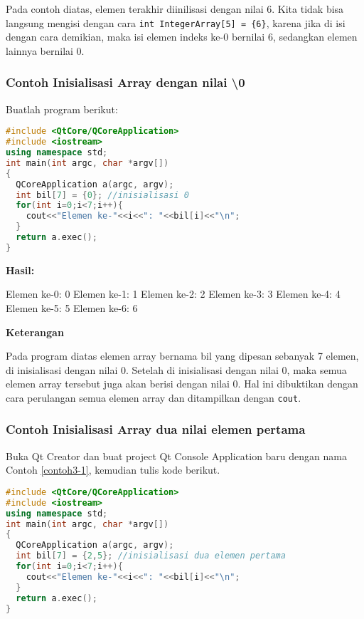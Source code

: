 Pada contoh diatas, elemen terakhir diinilisasi dengan nilai 6. Kita
tidak bisa langsung mengisi dengan cara
\texttt{int\ IntegerArray{[}5{]}\ =\ \{6\}}, karena jika di isi dengan
cara demikian, maka isi elemen indeks ke-0 bernilai 6, sedangkan elemen
lainnya bernilai 0.

\subsubsection*{Contoh  Inisialisasi Array dengan nilai \textbackslash{}0}

Buatlah program berikut:

\begin{lstlisting}[language=c++, caption=Inisialisasi Array dengan nilai \textbackslash{}0, label=contoh3-4]
#include <QtCore/QCoreApplication>
#include <iostream>
using namespace std;
int main(int argc, char *argv[])
{
  QCoreApplication a(argc, argv);
  int bil[7] = {0}; //inisialisasi 0
  for(int i=0;i<7;i++){
    cout<<"Elemen ke-"<<i<<": "<<bil[i]<<"\n";
  }
  return a.exec();
}
\end{lstlisting}

\textbf{Hasil:}

\begin{lcverbatim}
Elemen ke-0: 0
Elemen ke-1: 1
Elemen ke-2: 2
Elemen ke-3: 3
Elemen ke-4: 4
Elemen ke-5: 5
Elemen ke-6: 6
\end{lcverbatim}

\textbf{Keterangan}

Pada program diatas elemen array bernama bil yang dipesan sebanyak 7
elemen, di inisialisasi dengan nilai 0. Setelah di inisialisasi dengan
nilai 0, maka semua elemen array tersebut juga akan berisi dengan nilai
0. Hal ini dibuktikan dengan cara perulangan semua elemen array dan
ditampilkan dengan \texttt{cout}.

\subsubsection*{Contoh  Inisialisasi Array dua nilai elemen pertama}

Buka Qt Creator dan buat project Qt Console Application baru dengan
nama Contoh \ref{contoh3-1}, kemudian tulis kode berikut.

\begin{lstlisting}[language=c++, caption=Inisialisasi Array dua nilai elemen pertama, label=contoh3-5]
#include <QtCore/QCoreApplication>
#include <iostream>
using namespace std;
int main(int argc, char *argv[])
{
  QCoreApplication a(argc, argv);
  int bil[7] = {2,5}; //inisialisasi dua elemen pertama
  for(int i=0;i<7;i++){
    cout<<"Elemen ke-"<<i<<": "<<bil[i]<<"\n";
  }
  return a.exec();
}
\end{lstlisting}

